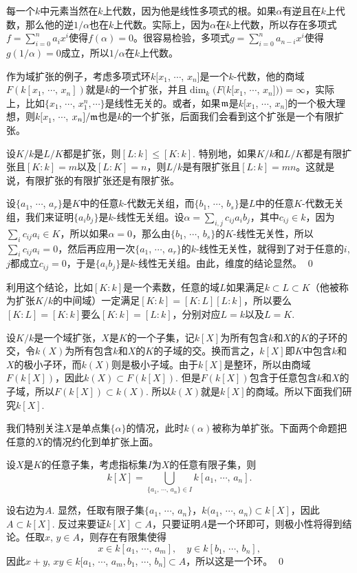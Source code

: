 每一个$k$中元素当然在$k$上代数，因为他是线性多项式的根。如果$\alpha$有逆且在$k$上代数，那么他的逆$1/\alpha$也在$k$上代数。实际上，因为$\alpha$在$k$上代数，所以存在多项式$f=\sum_{i=0}^na_ix^i$使得$f(\alpha)=0$。很容易检验，多项式$g=\sum_{i=0}^na_{n-i}x^i$使得$g(1/\alpha)=0$成立，所以$1/\alpha$在$k$上代数。

作为域扩张的例子，考虑多项式环$k[x_1$, $\cdots$, $x_n]$是一个$k$-代数，他的商域$F(k[x_1,\,\cdots\!,\,x_n])$就是$k$的一个扩张，并且$\dim_k(F(k[x_1$, $\cdots$, $x_n]))=\infty$，实际上，比如$\{x_1$, $\cdots$, $x_1^n,\cdots\}$是线性无关的。或者，如果$\mathfrak{m}$是$k[x_1$, $\cdots$, $x_n]$的一个极大理想，则$k[x_1$, $\cdots$, $x_n]/\mathfrak{m}$也是$k$的一个扩张，后面我们会看到这个扩张是一个有限扩张。

\pro 设$K/k$是$L/K$都是扩张，则$[L:k]\leq[K:k]$. 特别地，如果$K/k$和$L/K$都是有限扩张且$[K:k]=m$以及$[L:K]=n$，则$L/k$是有限扩张且$[L:k]=mn$。这就是说，有限扩张的有限扩张还是有限扩张。

\proof 
	设$\{a_1$, $\cdots$, $a_r\}$是$K$中的任意$k$-代数无关组，而$\{b_1$, $\cdots$, $b_s\}$是$L$中的任意$K$-代数无关组，我们来证明$\{a_ib_j\}$是$k$-线性无关组。设$\alpha=\sum_{i,j}c_{ij}a_ib_j$，其中$c_{ij}\in k$，因为$\sum_i c_{ij}a_i\in K$，所以如果$\alpha=0$，那么由$\{b_1$, $\cdots$, $b_s\}$的$K$-线性无关性，所以$\sum_i c_{ij}a_i=0$，然后再应用一次$\{a_1$, $\cdots$, $a_r\}$的$k$-线性无关性，就得到了对于任意的$i$, $j$都成立$c_{ij}=0$，于是$\{a_ib_j\}$是$k$-线性无关组。由此，维度的结论显然。
\qed

利用这个结论，比如$[K:k]$是一个素数，任意的域$L$如果满足$k\subset L\subset K$（他被称为扩张$K/k$的中间域）一定满足$[K:k]=[K:L][L:k]$，所以要么$[K:L]=[K:k]$要么$[K:k]=[L:k]$，分别对应$L=k$以及$L=K$. 

\para 设$K/k$是一个域扩张，$X$是$K$的一个子集，记$k[X]$为所有包含$k$和$X$的$K$的子环的交，令$k(X)$为所有包含$k$和$X$的$K$的子域的交。换而言之，$k[X]$即$K$中包含$k$和$X$的极小子环，而$k(X)$则是极小子域。由于$k[X]$是整环，所以由商域$F(k[X])$，因此$k(X)\subset F(k[X])$. 但是$F(k[X])$包含于任意包含$k$和$X$的子域，所以$F(k[X])\subset k(X)$. 所以$k(X)$就是$k[X]$的商域。所以下面我们研究$k[X]$.

我们特别关注$X$是单点集$\{\alpha\}$的情况，此时$k(\alpha)$被称为单扩张。下面两个命题把任意的$X$的情况约化到单扩张上面。

\pro 设$X$是$K$的任意子集，考虑指标集$I$为$X$的任意有限子集，则
\[
	k[X]=\bigcup_{\{a_1,\,\cdots\!,\,a_n\}\in I} k[a_1,\,\cdots\!,\,a_n].
\]

\proof
	设右边为$A$. 显然，任取有限子集$\{a_1$, $\cdots$, $a_n\}$，$k(a_1$, $\cdots$, $a_n)\subset k[X]$，因此$A\subset k[X]$. 反过来要证$k[X]\subset A$，只要证明$A$是一个环即可，则极小性将得到结论。任取$x$, $y\in A$，则存在有限集使得
	\[
		x\in k[a_1,\,\cdots\!,\,a_m],\quad y\in k[b_1,\,\cdots\!,\,b_n],
	\]
	因此$x+y$, $xy\in k[a_1$, $\cdots$, $a_m,b_1$, $\cdots$, $b_n]\subset A$，所以这是一个环。
\qed

